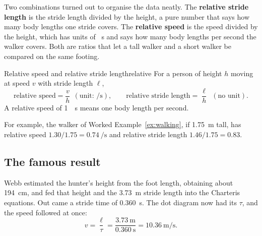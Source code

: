 Two combinations turned out to organise the data neatly. The \textbf{relative stride length} is the stride length divided by the height, a pure number that says how many body lengths one stride covers. The \textbf{relative speed} is the speed divided by the height, which has units of \si{\per\second} and says how many body lengths per second the walker covers. Both are ratios that let a tall walker and a short walker be compared on the same footing.

\begin{definition}{Relative speed and relative stride length}{relative}
For a person of height $h$ moving at speed $v$ with stride length $\ell$,
\[
\text{relative speed} = \frac{v}{h}\ \ (\text{unit: } \si{\per\second}), \qquad
\text{relative stride length} = \frac{\ell}{h}\ \ (\text{no unit}).
\]
A relative speed of \SI{1}{\per\second} means one body length per second.
\end{definition}

For example, the walker of Worked Example~\ref{ex:walking}, if \SI{1.75}{\metre} tall, has relative speed $1.30/1.75 = \SI{0.74}{\per\second}$ and relative stride length $1.46/1.75 = 0.83$.

\subsection{The famous result}

Webb estimated the hunter's height from the foot length, obtaining about \SI{194}{\centi\metre}, and fed that height and the \SI{3.73}{\metre} stride length into the Charteris equations. Out came a stride time of \SI{0.360}{\second}. The dot diagram now had its $\tau$, and the speed followed at once:
\[
v = \frac{\ell}{\tau} = \frac{\SI{3.73}{\metre}}{\SI{0.360}{\second}} = \SI{10.36}{\metre\per\second}.
\]

